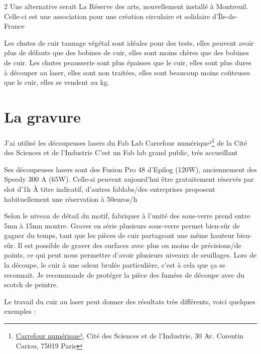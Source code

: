 \documentclass[a4paper,11pt]{article}
\begin{document}
\begin{blogmain}
\begin{multicols}{2}
  Une alternative serait La Réserve des arts, nouvellement installé à Montreuil.
  Celle-ci est une association pour une création circulaire et solidaire d'Île-de-France

  Les chutes de cuir tannage végétal sont idéales pour des tests, elles peuvent avoir plus de défauts que des bobines de cuir, elles sont moins chères que des bobines de cuir.
  Les chutes peausserie sont plus épaisses que le cuir, elles sont plus dures à découper au laser, elles sont non traitées, elles sont beaucoup moins coûteuses que le cuir, elles se vendent au kg.

  \section{La gravure}
  
  J'ai utilisé les découpeuses lasers du Fab Lab Carrefour numérique²\footnote{\href{https://www.cite-sciences.fr/fr/au-programme/lieux-ressources/carrefour-numerique2/fab-lab}{Carrefour numérique²}, Cité des Sciences et de l'Industrie, 30 Av. Corentin Cariou, 75019 Paris} de la Cité des Sciences et de l'Industrie
  C'est un Fab lab grand public, très accueillant
  
  Ses découpeuses lasers sont des Fusion Pro 48 d'Epilog (120W), anciennement des Speedy 300 A (65W).
  Celle-si peuvent aujourd'hui être gratuitement réservés par slot d'1h
  À titre indicatif, d'autres fablabs/des entreprises proposent habituellement une réservation à 50euros/h
  
  Selon le niveau de détail du motif, fabriquer à l'unité des sous-verre prend entre 5mn à 15mn montre.
  Graver en série plusieurs sous-verre permet bien-sûr de gagner du temps, tant que les pièces de cuir partageant une même hauteur bien-sûr.
  Il est possible de graver des surfaces avec plus ou moins de précisions/de points, ce qui peut nous permettre d'avoir plusieurs niveaux de seuillages.
  Lors de la découpe, le cuir à une odeur brulée particulière, c'est à cela que ça se reconnait.
  Je recommande de protéger la pièce des fumées de découpe avec du scotch de peintre.

  \vspace{85mm}
  
  Le travail du cuir au laser peut donner des résultats très différents, voici quelques exemples :
  


\end{multicols}
\end{blogmain}
\end{document}

